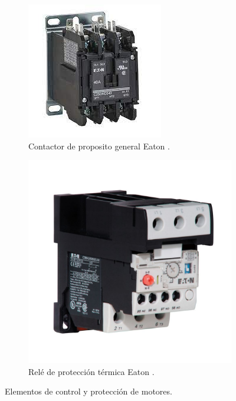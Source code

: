 \begin{figure}
	\centering
	\begin{subfigure}[b]{0.4\textwidth}
		\centering
		\includegraphics[width=\textwidth]{Imagenes/Contactor}
		\caption{Contactor de proposito general Eaton \cite{Eaton1}.}
		\label{fig:contactor}
	\end{subfigure}
\hfill
	\begin{subfigure}[b]{0.4\textwidth}
		\centering
		\includegraphics[width=\textwidth]{Imagenes/relevador}
		\caption{Relé de protección térmica Eaton \cite{Eaton2}.}
		\label{fig:rele}
	\end{subfigure}
\caption{Elementos de control y protección de motores.}
\end{figure}


